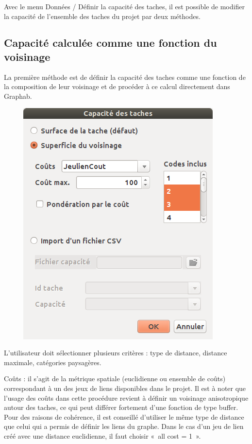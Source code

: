 \documentclass{article}
\begin{document}
Avec le menu Données / Définir la capacité des taches, il est possible de modifier la capacité de l'ensemble des taches du projet par deux méthodes.

\subsection{Capacité calculée comme une fonction du voisinage}

La première méthode est de définir la capacité des taches comme une fonction de la composition de leur voisinage et de procéder à ce calcul directement dans Graphab.

\begin{figure}[H]
	\includegraphics[scale=0.5]{img/manual-fr_img8.png} 
\end{figure}

L’utilisateur doit sélectionner plusieurs critères : type de distance, distance maximale, catégories paysagères.

Coûts : il s’agit de la métrique spatiale (euclidienne ou ensemble de coûts) correspondant à un des jeux de liens disponibles dans le projet. Il est à noter que l’usage des coûts dans cette procédure revient à définir un voisinage anisotropique autour des taches, ce qui peut différer fortement d’une fonction de type buffer. Pour des raisons de cohérence, il est conseillé d’utiliser le même type de distance que celui qui a permis de définir les liens du graphe. Dans le cas d’un jeu de lien créé avec une distance euclidienne, il faut choisir «~all cost = 1~».
\end{document}
